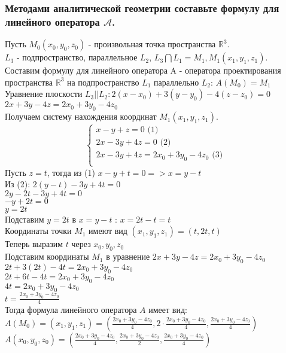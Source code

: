 \documentclass{article}
\begin{document}
    \subsubsection{Методами аналитической геометрии составьте формулу для линейного оператора $\mathcal{A}$.}
    Пусть $M_0 (x_0, y_0, z_0)$ - произвольная точка пространства $\mathbb{R}^3$.\\
    $L_3$ - подпространство, параллельное $L_2$, $L_3 \bigcap L_1 = M_1, M_1 (x_1, y_1, z_1)$.\\
    Составим формулу для линейного оператора A - оператора проектирования пространства $\mathbb{R}^3$ на подпространство $L_1$ параллельно $L_2$: $A(M_0) = M_1$ \\
    Уравнение плоскости $L_3 || L_2: 2(x-x_0) + 3(y-y_0) - 4(z-z_0) = 0$ \\
    $2x+3y-4z = 2x_0 + 3y_0 - 4z_0$ \\
    Получаем систему нахождения координат $M_1 ( x_1, y_1, z_1)$.\\
    \begin{equation*}
        \begin{cases}
            x - y + z = 0 \text{   (1)} \\
            2x - 3y + 4z = 0 \text{   (2)}\\
            2x-3y+4z = 2x_0 + 3y_0 - 4z_0 \text{   (3)}\\
        \end{cases}
    \end{equation*}
    Пусть $z=t$, тогда из (1) $x - y + t = 0 => x = y - t$\\
    Из (2): $2(y-t) - 3y + 4t = 0$ \\
    $2y - 2t - 3y + 4t = 0$ \\
    $-y + 2t = 0$ \\
    $y = 2t$\\
    Подставим $y = 2t$ в $x = y - t$  :  $x = 2t - t = t $\\
    Координаты точки $M_1$ имеют вид $(x_1, y_1, z_1) = (t,2t,t)$\\
    Теперь выразим $t$ через $x_0, y_0, z_0$ \\
    Подставим координаты $M_1$ в уравнение $2x + 3y - 4z = 2x_0 + 3y_0 - 4 z_0$ \\
    $2t + 3(2t) - 4t = 2x_0 + 3y_0 - 4z_0$ \\
    $2t + 6t - 4t = 2x_0 + 3y_0 - 4z_0$\\
    $4t = 2x_0 + 3y_0 - 4z_0$\\
    $t = \frac{2x_0 + 3y_0 - 4z_0}{4}$\\
    Тогда формула линейного оператора $A$ имеет вид:\\
    $A(M_0) = (x_1, y_1, z_1) = (\frac{2x_0 + 3y_0 - 4z_0}{4},2 \cdot \frac{2x_0 + 3y_0 - 4z_0}{4}, \frac{2x_0 + 3y_0 - 4z_0}{4})$ \\
    $A(x_0, y_0, z_0) =(\frac{2x_0 + 3y_0 - 4z_0}{4}, \frac{2x_0 + 3y_0 - 4z_0}{2}, \frac{2x_0 + 3y_0 - 4z_0}{4})$ \\
  
\end{document}
